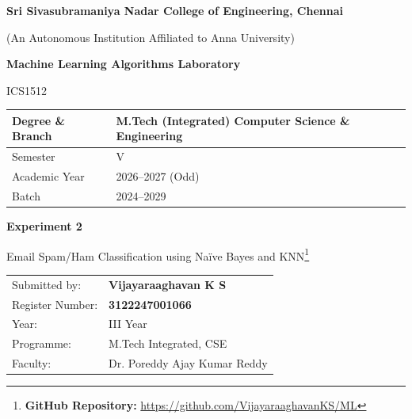 \documentclass[11pt,a4paper]{article}
\title{}
\date{}
\begin{document}
\begin{titlepage}
\centering
\vspace*{1cm}
{\Large\bfseries Sri Sivasubramaniya Nadar College of Engineering, Chennai\par}
\vspace{0.2cm}
{\normalsize (An Autonomous Institution Affiliated to Anna University)\par}
\vspace{1.2cm}

{\Large\bfseries Machine Learning Algorithms Laboratory\par}
\vspace{0.3cm}
{\large ICS1512\par}
\vspace{1.5cm}

\begin{tabular}{|p{5.5cm}|p{7cm}|}
\hline
Degree \& Branch & M.Tech (Integrated) Computer Science \& Engineering \\
\hline
Semester & V \\
\hline
Academic Year & 2026--2027 (Odd) \\
\hline
Batch & 2024--2029 \\
\hline
\end{tabular}

\vspace{1.8cm}
{\Large\bfseries Experiment 2\par}
\vspace{0.3cm}
{\large Email Spam/Ham Classification using Na\"ive Bayes and KNN\footnote{\textbf{GitHub Repository: }\url{https://github.com/VijayaraaghavanKS/ML}}\par}
\vspace{2.5cm}

\begin{tabular}{ll}
Submitted by: & \textbf{Vijayaraaghavan K S} \\[4pt]
Register Number: & \textbf{3122247001066} \\[4pt]
Year: & III Year \\[4pt]
Programme: & M.Tech Integrated, CSE \\[4pt]
Faculty: & Dr. Poreddy Ajay Kumar Reddy \\[4pt]
\end{tabular}

\vfill
\end{titlepage}

\tableofcontents
\newpage
\end{document}
